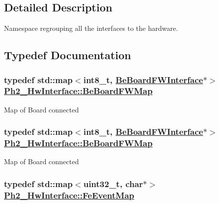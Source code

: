 \subsection{Detailed Description}
Namespace regrouping all the interfaces to the hardware. 

\subsection{Typedef Documentation}
\hypertarget{namespace_ph2___hw_interface_59fe3165f25ded62b5b12cf0ebc69e8d}{
\subsubsection[BeBoardFWMap]{\setlength{\rightskip}{0pt plus 5cm}typedef std::map$<$int8\_\-t, \hyperlink{class_ph2___hw_interface_1_1_be_board_f_w_interface}{Be\-Board\-FWInterface}$\ast$$>$ \hyperlink{namespace_ph2___hw_interface_59fe3165f25ded62b5b12cf0ebc69e8d}{Ph2\_\-Hw\-Interface::Be\-Board\-FWMap}}}
\label{namespace_ph2___hw_interface_59fe3165f25ded62b5b12cf0ebc69e8d}


Map of Board connected \hypertarget{namespace_ph2___hw_interface_59fe3165f25ded62b5b12cf0ebc69e8d}{
\subsubsection[BeBoardFWMap]{\setlength{\rightskip}{0pt plus 5cm}typedef std::map$<$int8\_\-t, \hyperlink{class_ph2___hw_interface_1_1_be_board_f_w_interface}{Be\-Board\-FWInterface}$\ast$$>$ \hyperlink{namespace_ph2___hw_interface_59fe3165f25ded62b5b12cf0ebc69e8d}{Ph2\_\-Hw\-Interface::Be\-Board\-FWMap}}}
\label{namespace_ph2___hw_interface_59fe3165f25ded62b5b12cf0ebc69e8d}


Map of Board connected \hypertarget{namespace_ph2___hw_interface_50d97ee46941c2c0c2ecadc929e41b05}{
\subsubsection[FeEventMap]{\setlength{\rightskip}{0pt plus 5cm}typedef std::map$<$uint32\_\-t, char$\ast$$>$ \hyperlink{namespace_ph2___hw_interface_50d97ee46941c2c0c2ecadc929e41b05}{Ph2\_\-Hw\-Interface::Fe\-Event\-Map}}}
\label{namespace_ph2___hw_interface_50d97ee46941c2c0c2ecadc929e41b05}


